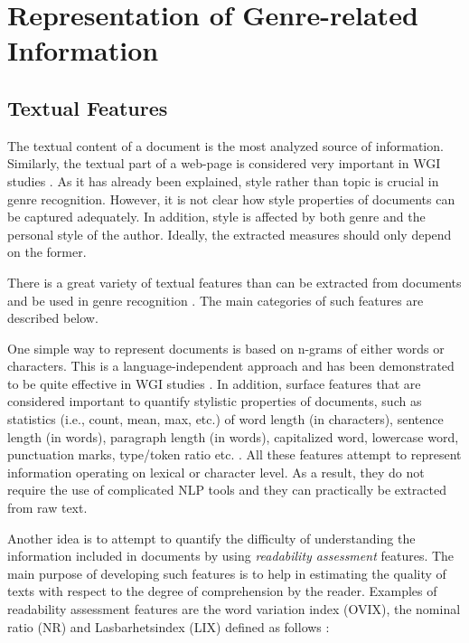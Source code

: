 \section{Representation of Genre-related Information}

\subsection{Textual Features}

The textual content of a document is the most analyzed source of information. Similarly, the textual part of a web-page is considered very important in WGI studies \parencite{mason2009distance,Sharroff2010}. As it has already been explained, style rather than topic is crucial in genre recognition. However, it is not clear how style properties of documents can be captured adequately. In addition, style is affected by both genre and the personal style of the author. Ideally, the extracted measures should only depend on the former. 

There is a great variety of textual features than can be extracted from documents and be used in genre recognition \parencite{kanaris2009learning,kumari2014web,levering2008using,Lim2005,mason2009n,onan2018ensemble,petrenz2011stable,sharoff2010web,Nooralahzadeh2014}. The main categories of such features are described below.

One simple way to represent documents is based on n-grams of either words or characters. This is a language-independent approach and has been demonstrated to be quite effective in WGI studies . In addition, surface features that are considered important to quantify stylistic properties of documents, such as statistics (i.e., count, mean, max, etc.) of word length (in characters), sentence length (in words), paragraph length (in words), capitalized word, lowercase word, punctuation marks, type/token ratio etc. \parencite{feldman2009classifying,santini2005linguistic,onan2018ensemble}. All these features attempt to represent information operating on lexical or character level. As a result, they do not require the use of complicated NLP tools and they can practically be extracted from raw text.

Another idea is to attempt to quantify the difficulty of understanding the information included in documents by using \textit{readability assessment} features. The main purpose of developing such features is to help in estimating the quality of texts with respect to the degree of comprehension by the reader. Examples of readability assessment features are the word variation index (OVIX), the nominal ratio (NR) and Lasbarhetsindex (LIX) defined as follows \parencite{falkenjack2013features}:

